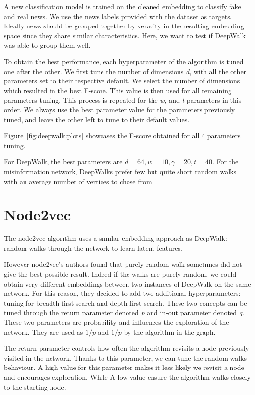 A new classification model is trained on the cleaned embedding to classify fake and real news.
We use the news labels provided with the dataset as targets.
Ideally news should be grouped together by veracity in the resulting embedding space since they share similar characteristics.
Here, we want to test if DeepWalk was able to group them well.

To obtain the best performance, each hyperparameter of the algorithm is tuned one after the other.
We first tune the number of dimensions \textit{d}, with all the other parameters set to their respective default.
We select the number of dimensions which resulted in the best F-score.
This value is then used for all remaining parameters tuning.
This process is repeated for the \textit{w}, \textit{\gamma} and \textit{t} parameters in this order.
We always use the best parameter value for the parameters previously tuned, and leave the other left to tune to their default values.

Figure~\ref{fig:deepwalk:plots} showcases the F-score obtained for all 4 parameters tuning.

For DeepWalk, the best parameters are $d=64, w=10, \gamma=20, t=40$.
For the misinformation network, DeepWalks prefer few but quite short random walks with an average number of vertices to chose from.

\newpage
\section{Node2vec}

The node2vec algorithm uses a similar embedding approach as DeepWalk: random walks through the network to learn latent features.

However node2vec's authors found that purely random walk sometimes did not give the best possible result.
Indeed if the walks are purely random, we could obtain very different embeddings between two instances of DeepWalk on the same network.
For this reason, they decided to add two additional hyperparameters: tuning for breadth first search and depth first search.
These two concepts can be tuned through the return parameter denoted \textit{p} and in-out parameter denoted \textit{q}.
These two parameters are probability and influences the exploration of the network.
They are used as $1/p$ and $1/p$ by the algorithm in the graph.

The return parameter controls how often the algorithm revisits a node previously visited in the network.
Thanks to this parameter, we can tune the random walks behaviour.
A high value for this parameter makes it less likely we revisit a node and encourages exploration.
While A low value ensure the algorithm walks closely to the starting node.

